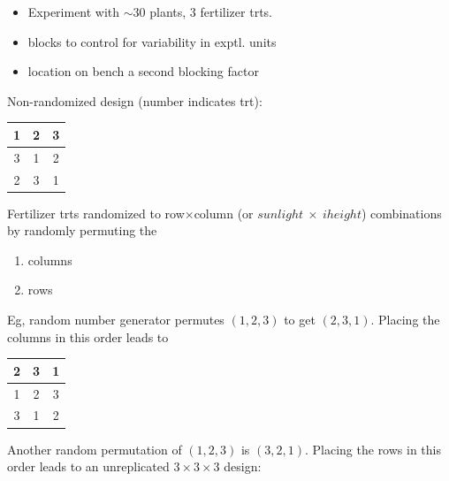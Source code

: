 \newpage

\begin{itemize}
\item
Experiment with $\sim 30$ plants, 3 fertilizer trts.
\item
blocks to control for variability in exptl. units  
\item location on bench a second blocking factor
\end{itemize}
Non-randomized design (number indicates trt):
\begin{center}
\begin{tabular}{|c|c|c|} \hline
1 & 2 & 3 \\ \hline
3 & 1 & 2 \\ \hline
2 & 3 & 1 \\ \hline
\end{tabular}
\end{center}
Fertilizer trts randomized to row$\times$column
(or $sunlight \ \times \ iheight$) combinations by randomly permuting the
\begin{enumerate}
\item columns
\item rows
\end{enumerate}
Eg, random number generator permutes $(1,2,3)$ to get
$(2,3,1)$.  Placing the columns in this order leads to 
\begin{center}
\begin{tabular}{|c|c|c|} \hline
2 & 3 & 1 \\ \hline
1 & 2 & 3 \\ \hline
3 & 1 & 2 \\ \hline
\end{tabular}
\end{center}
\newpage
\noindent
Another random permutation of $(1,2,3)$ is $(3,2,1)$.  
Placing the rows in this order leads to 
an unreplicated $3 \times 3 \times 3$ design:

